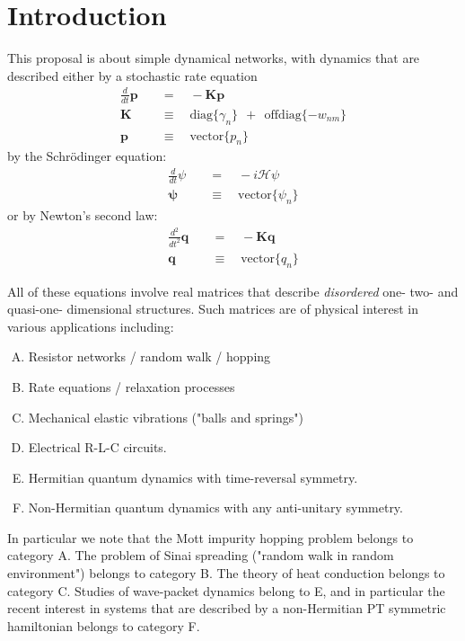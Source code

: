 \chapter{Introduction}\label{sec:matrices}


This proposal is about simple dynamical networks, with dynamics
that are described either by a stochastic rate equation
%
\begin{align}
  \frac{d}{dt}\mathbf{p} \quad &= \quad -\mathbf{K} \mathbf{p} \\
  \mathbf{K} \quad &\equiv \quad \textrm{diag}\{ \gamma_n \} \ \ +\ \ \textrm{offdiag}\{ -w_{nm} \} \\
  \mathbf{p} \quad &\equiv \quad \textrm{vector}\{ p_n \}
\end{align}
%
by the Schr\"{o}dinger equation:
%
\begin{align}
  \frac{d}{dt}\psi \quad &= \quad -i \mathcal{H}\psi \\
  \mathbf{\psi} \quad &\equiv \quad \textrm{vector}\{ \psi_n \}
\end{align}
%
or by Newton's second law:
%
\begin{align}
  \frac{d^2}{dt^2}\mathbf{q} \quad &= \quad -\mathbf{K} \mathbf{q} \\
  \mathbf{q} \quad &\equiv \quad \textrm{vector}\{ q_n \}
\end{align}
%


All of these equations 
involve {\rm real} matrices that describe {\em disordered} 
one- two- and quasi-one- dimensional structures. Such matrices 
are of physical interest in various applications including:

\begin{enumerate}[A. ]
\item Resistor networks / random walk / hopping 
\item Rate equations / relaxation processes 
\item Mechanical elastic vibrations ("balls and springs")
\item Electrical R-L-C circuits.
\item Hermitian quantum dynamics with time-reversal symmetry. 
\item Non-Hermitian quantum dynamics with any anti-unitary symmetry. 
\end{enumerate}

In particular we note that the Mott impurity hopping problem 
belongs to category A. The problem of Sinai spreading ("random 
walk in random environment") belongs to category B. 
The theory of heat conduction belongs to category C. 
Studies of wave-packet dynamics belong to E, and 
in particular the recent interest in systems that are described by 
a non-Hermitian PT symmetric hamiltonian belongs to category F.

